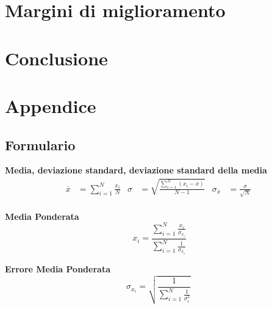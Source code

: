 \documentclass[a4paper,11pt,oneside]{article}
\begin{document}
\section{Margini di miglioramento}

\section{Conclusione}

\section{Appendice}

\subsection{Formulario}
\textbf{Media, deviazione standard, deviazione standard della media}
\begin{align*}
        \overline{x}&=\sum\limits_{i=1}^{N} \frac{x_{i}}{N}&
        \sigma&=\sqrt{\frac{\sum\limits_{i=1}^{N} (x_{i}-\overline{x})}{N-1}}&
        \sigma_{\overline{x}}&=\frac{\sigma}{\sqrt{N}}
\end{align*}\\

\textbf{Media Ponderata}
\begin{equation*}\
    x_i=\frac{\sum_{i=1}^{N}\frac{x_i}{\sigma_{x_i}}}{\sum_{i=1}^{N}\frac{1}{\sigma_{x_i}}} \label{eq:media_ponderata}
\end{equation*}

\textbf{Errore Media Ponderata}
\begin{equation*}
     \sigma_{x_i}=\sqrt{\frac{1}{\sum_{i=1}^{N}\frac{1}{\sigma_{i}^{2}}}}\label{eq:errore_media_pond}
\end{equation*}
\end{document}
